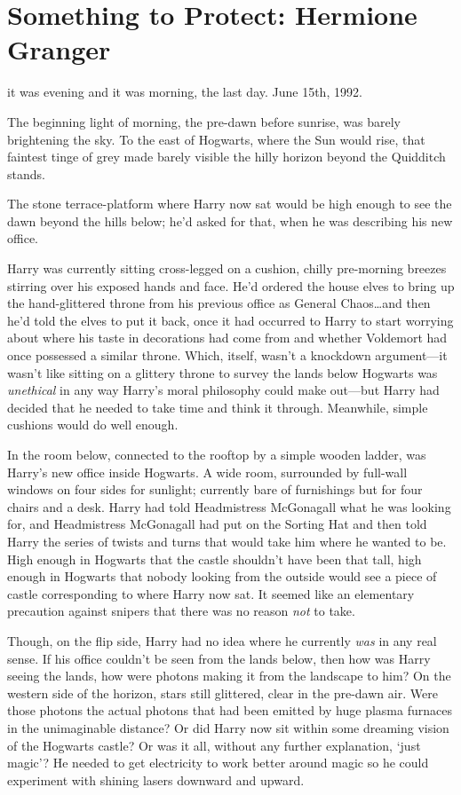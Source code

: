 \chapter{Something to Protect: Hermione Granger}

 it was evening and it was morning, the last day. June 15th, 1992.

\hplettrineextrapara
The beginning light of morning, the pre-dawn before sunrise, was barely brightening the sky. To the east of Hogwarts, where the Sun would rise, that faintest tinge of grey made barely visible the hilly horizon beyond the Quidditch stands.

The stone terrace-platform where Harry now sat would be high enough to see the dawn beyond the hills below; he’d asked for that, when he was describing his new office.

Harry was currently sitting cross-legged on a cushion, chilly pre-morning breezes stirring over his exposed hands and face. He’d ordered the house elves to bring up the hand-glittered throne from his previous office as General Chaos…and then he’d told the elves to put it back, once it had occurred to Harry to start worrying about where his taste in decorations had come from and whether Voldemort had once possessed a similar throne. Which, itself, wasn’t a knockdown argument—it wasn’t like sitting on a glittery throne to survey the lands below Hogwarts was \emph{unethical} in any way Harry’s moral philosophy could make out—but Harry had decided that he needed to take time and think it through. Meanwhile, simple cushions would do well enough.

In the room below, connected to the rooftop by a simple wooden ladder, was Harry’s new office inside Hogwarts. A wide room, surrounded by full-wall windows on four sides for sunlight; currently bare of furnishings but for four chairs and a desk. Harry had told Headmistress McGonagall what he was looking for, and Headmistress McGonagall had put on the Sorting Hat and then told Harry the series of twists and turns that would take him where he wanted to be. High enough in Hogwarts that the castle shouldn’t have been that tall, high enough in Hogwarts that nobody looking from the outside would see a piece of castle corresponding to where Harry now sat. It seemed like an elementary precaution against snipers that there was no reason \emph{not} to take.

Though, on the flip side, Harry had no idea where he currently \emph{was} in any real sense. If his office couldn’t be seen from the lands below, then how was Harry seeing the lands, how were photons making it from the landscape to him? On the western side of the horizon, stars still glittered, clear in the pre-dawn air. Were those photons the actual photons that had been emitted by huge plasma furnaces in the unimaginable distance? Or did Harry now sit within some dreaming vision of the Hogwarts castle? Or was it all, without any further explanation, ‘just magic’? He needed to get electricity to work better around magic so he could experiment with shining lasers downward and upward.


